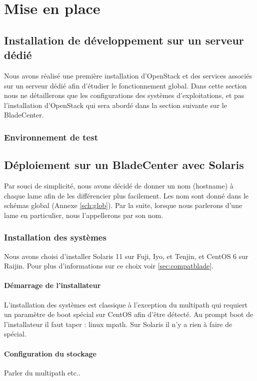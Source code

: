 \documentclass[a4paper,oneside]{report}
\begin{document}
\chapter{Mise en place} \label{cha:miseenplace}
\section{Installation de développement sur un serveur dédié}
Nous avons réalisé une première installation d'OpenStack et des services associés sur un serveur dédié afin d'étudier le fonctionnement global.
Dans cette section nous ne détaillerons que les configurations des systèmes d'exploitations, et pas l'installation d'OpenStack qui sera abordé dans la section suivante sur le BladeCenter.

\subsection{Environnement de test}

\section{Déploiement sur un BladeCenter avec Solaris}

Par souci de simplicité, nous avons décidé de donner un nom (hostname) à chaque lame afin de les différencier plus facilement.
Les nom sont donné dans le schémas global (Annexe \ref{sch:glob}).
Par la suite, lorsque nous parlerons d'une lame en particulier, nous l'appellerons par son nom.

\subsection{Installation des systèmes}
Nous avons choisi d'installer Solaris 11 sur Fuji, Iyo, et Tenjin, et CentOS 6 sur Raijin.
Pour plus d'informations sur ce choix voir \ref{sec:compatblade}.

\subsubsection{Démarrage de l'installateur}
L'installation des systèmes est classique à l'exception du multipath qui requiert un paramètre de boot spécial sur CentOS afin d'être détecté.
Au prompt boot de l'installateur il faut taper : linux mpath.\newline
Sur Solaris il n'y a rien à faire de spécial.

\subsubsection{Configuration du stockage}
Parler du multipath etc..
\end{document}
